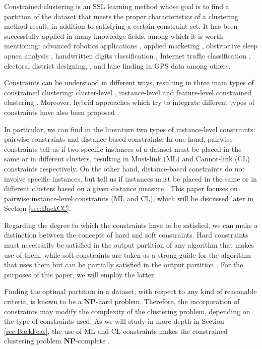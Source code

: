 \documentclass[review]{elsarticle}
\begin{document}
Constrained clustering is an SSL learning method whose goal is to find a partition of the dataset that meets the proper characteristics of a clustering method result, in addition to satisfying a certain constraint set. It has been successfully applied in many knowledge fields, among which it is worth mentioning: advanced robotics applications \cite{davidson2005clustering, semnani2016constrained}, applied marketing \cite{seret2014new}, obstructive sleep apnea analysis \cite{mai2018evolutionary}, handwritten digits classification \cite{li2015scalable}, Internet traffic classification \cite{wang2014internet}, electoral district designing, \cite{brieden2017constrained}, and lane finding in GPS data \cite{wagstaff2001constrained} among others.

Constraints can be understood in different ways, resulting in three main types of constrained clustering: cluster-level \cite{bradley2000constrained}, instance-level \cite{davidson2007survey} and feature-level constrained clustering \cite{schmidt2011clustering}. Moreover, hybrid approaches which try to integrate different types of constraints have also been proposed \cite{wang2010clustering}. 

In particular, we can find in the literature two types of instance-level constraints: pairwise constraints and distance-based constraints. In one hand, pairwise constraints tell us if two specific instances of a dataset must be placed in the same or in different clusters, resulting in Must-link (ML) and Cannot-link (CL) constraints respectively. On the other hand, distance-based constraints do not involve specific instances, but tell us if instances must be placed in the same or in different clusters based on a given distance measure \cite{davidson2007survey}. This paper focuses on pairwise instance-level constraints (ML and CL), which will be discussed later in Section \ref{sec:BackCC}.

Regarding the degree to which the constraints have to be satisfied, we can make a distinction between the concepts of hard \cite{wagstaff2001constrained} and soft \cite{law2004clustering} constraints. Hard constraints must necessarily be satisfied in the output partition of any algorithm that makes use of them, while soft constraints are taken as a strong guide for the algorithm that uses them but can be partially satisfied in the output partition \cite{seret2014new}. For the purposes of this paper, we will employ the latter.

Finding the optimal partition in a dataset, with respect to any kind of reasonable criteria, is known to be a $\mathbf{NP}$-hard problem. Therefore, the incorporation of constraints may modify the complexity of the clustering problem, depending on the type of constraints used. As we will study in more depth in Section \ref{sec:BackFeas}, the use of ML and CL constraints makes the constrained clustering problem $\mathbf{NP}$-complete \cite{davidson2005clustering}.
\end{document}
